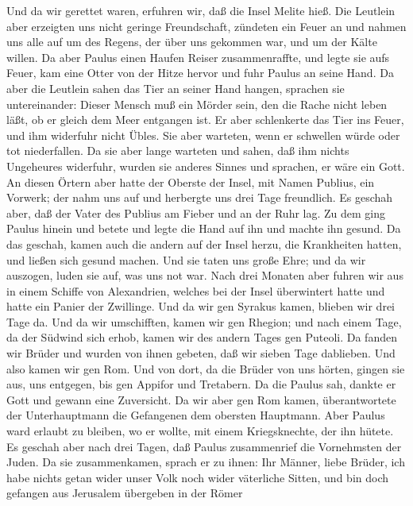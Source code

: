  Und da wir gerettet waren, erfuhren wir, daß die Insel
Melite hieß.  Die Leutlein aber erzeigten uns nicht geringe
Freundschaft, zündeten ein Feuer an und nahmen uns alle auf um des
Regens, der über uns gekommen war, und um der Kälte willen. 
Da aber Paulus einen Haufen Reiser zusammenraffte, und legte sie aufs
Feuer, kam eine Otter von der Hitze hervor und fuhr Paulus an seine
Hand.  Da aber die Leutlein sahen das Tier an seiner Hand
hangen, sprachen sie untereinander: Dieser Mensch muß ein Mörder sein,
den die Rache nicht leben läßt, ob er gleich dem Meer entgangen ist.
 Er aber schlenkerte das Tier ins Feuer, und ihm widerfuhr
nicht Übles.  Sie aber warteten, wenn er schwellen würde
oder tot niederfallen. Da sie aber lange warteten und sahen, daß ihm
nichts Ungeheures widerfuhr, wurden sie anderes Sinnes und sprachen, er
wäre ein Gott.  An diesen Örtern aber hatte der Oberste der
Insel, mit Namen Publius, ein Vorwerk; der nahm uns auf und herbergte
uns drei Tage freundlich.  Es geschah aber, daß der Vater
des Publius am Fieber und an der Ruhr lag. Zu dem ging Paulus hinein und
betete und legte die Hand auf ihn und machte ihn gesund.  Da
das geschah, kamen auch die andern auf der Insel herzu, die Krankheiten
hatten, und ließen sich gesund machen.  Und sie taten uns
große Ehre; und da wir auszogen, luden sie auf, was uns not war.
 Nach drei Monaten aber fuhren wir aus in einem Schiffe von
Alexandrien, welches bei der Insel überwintert hatte und hatte ein
Panier der Zwillinge.  Und da wir gen Syrakus kamen,
blieben wir drei Tage da.  Und da wir umschifften, kamen
wir gen Rhegion; und nach einem Tage, da der Südwind sich erhob, kamen
wir des andern Tages gen Puteoli.  Da fanden wir Brüder und
wurden von ihnen gebeten, daß wir sieben Tage dablieben. Und also kamen
wir gen Rom.  Und von dort, da die Brüder von uns hörten,
gingen sie aus, uns entgegen, bis gen Appifor und Tretabern. Da die
Paulus sah, dankte er Gott und gewann eine Zuversicht.  Da
wir aber gen Rom kamen, überantwortete der Unterhauptmann die Gefangenen
dem obersten Hauptmann. Aber Paulus ward erlaubt zu bleiben, wo er
wollte, mit einem Kriegsknechte, der ihn hütete.  Es
geschah aber nach drei Tagen, daß Paulus zusammenrief die Vornehmsten
der Juden. Da sie zusammenkamen, sprach er zu ihnen: Ihr Männer, liebe
Brüder, ich habe nichts getan wider unser Volk noch wider väterliche
Sitten, und bin doch gefangen aus Jerusalem übergeben in der Römer
